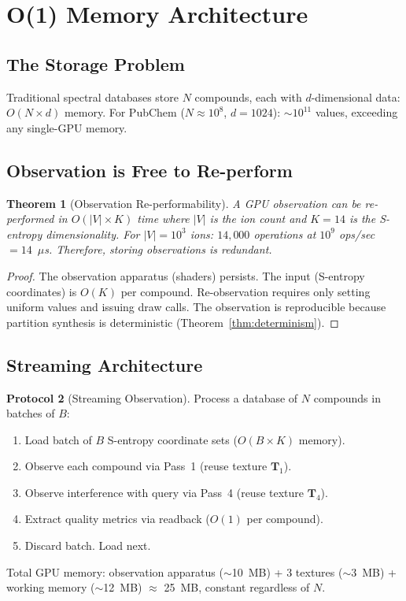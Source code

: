 \documentclass[11pt,twocolumn,a4paper]{article}
\newtheorem{theorem}{Theorem}[section]
\theoremstyle{definition}
\newtheorem{protocol}[theorem]{Protocol}
\theoremstyle{remark}
\newcommand{\Texture}{\mathbf{T}}
\begin{document}
\section{O(1) Memory Architecture}
\label{sec:memory}

\subsection{The Storage Problem}

Traditional spectral databases store $N$ compounds, each with $d$-dimensional data: $O(N \times d)$ memory. For PubChem ($N \approx 10^8$, $d = 1024$): $\sim 10^{11}$ values, exceeding any single-GPU memory.

\subsection{Observation is Free to Re-perform}

\begin{theorem}[Observation Re-performability]
\label{thm:reperform}
A GPU observation can be re-performed in $O(|V| \times K)$ time where $|V|$ is the ion count and $K = 14$ is the S-entropy dimensionality. For $|V| = 10^3$ ions: $14{,}000$ operations at $10^9$ ops/sec $= 14$~$\mu$s. Therefore, storing observations is redundant.
\end{theorem}

\begin{proof}
The observation apparatus (shaders) persists. The input (S-entropy coordinates) is $O(K)$ per compound. Re-observation requires only setting uniform values and issuing draw calls. The observation is reproducible because partition synthesis is deterministic (Theorem~\ref{thm:determinism}).
\end{proof}

\subsection{Streaming Architecture}

\begin{protocol}[Streaming Observation]
\label{prot:streaming}
Process a database of $N$ compounds in batches of $B$:
\begin{enumerate}[nosep]
\item Load batch of $B$ S-entropy coordinate sets ($O(B \times K)$ memory).
\item Observe each compound via Pass~1 (reuse texture $\Texture_1$).
\item Observe interference with query via Pass~4 (reuse texture $\Texture_4$).
\item Extract quality metrics via readback ($O(1)$ per compound).
\item Discard batch. Load next.
\end{enumerate}
Total GPU memory: observation apparatus ($\sim$10~MB) + 3 textures ($\sim$3~MB) + working memory ($\sim$12~MB) $\approx$ 25~MB, constant regardless of $N$.
\end{protocol}
\end{document}
